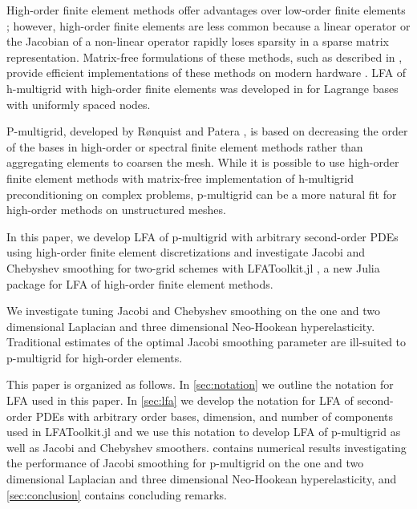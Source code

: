 \documentclass[review]{siamart190516}
\begin{document}
High-order finite element methods offer advantages over low-order finite elements \cite{demkowicz1989toward, oden1989toward, rachowicz1989toward}; however, high-order finite elements are less common because a linear operator or the Jacobian of a non-linear operator rapidly loses sparsity in a sparse matrix representation.
Matrix-free formulations of these methods, such as described in \cite{brown2010efficient, knoll2004jacobian}, provide efficient implementations of these methods on modern hardware \cite{libceed-user-manual, fischer2020scalability}.
LFA of h-multigrid with high-order finite elements was developed in \cite{he2020two} for Lagrange bases with uniformly spaced nodes.

P-multigrid, developed by R{\o}nquist and Patera \cite{ronquist1987spectral}, is based on decreasing the order of the bases in high-order or spectral finite element methods rather than aggregating elements to coarsen the mesh. While it is possible \cite{davydov2019matrix} to use high-order finite element methods with matrix-free implementation of h-multigrid preconditioning on complex problems, p-multigrid can be a more natural fit for high-order methods on unstructured meshes.

In this paper, we develop LFA of p-multigrid with arbitrary second-order PDEs using high-order finite element discretizations and investigate Jacobi and Chebyshev smoothing for two-grid schemes with LFAToolkit.jl \cite{thompson2021toolkit}, a new Julia package for LFA of high-order finite element methods.

We investigate tuning Jacobi and Chebyshev smoothing on the one and two dimensional Laplacian and three dimensional Neo-Hookean hyperelasticity.
Traditional estimates of the optimal Jacobi smoothing parameter are ill-suited to p-multigrid for high-order elements.

This paper is organized as follows.
In \cref{sec:notation} we outline the notation for LFA used in this paper.
In \cref{sec:lfa} we develop the notation for LFA of second-order PDEs with arbitrary order bases, dimension, and number of components used in LFAToolkit.jl and we use this notation to develop LFA of p-multigrid as well as Jacobi and Chebyshev smoothers.
 contains numerical results investigating the performance of Jacobi smoothing for p-multigrid on the one and two dimensional Laplacian and three dimensional Neo-Hookean hyperelasticity, and \cref{sec:conclusion} contains concluding remarks. 

\end{document}
